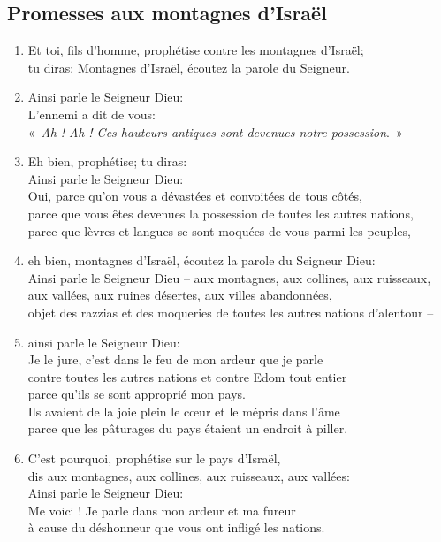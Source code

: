 \subsection*{Promesses aux montagnes d'Israël}
\begin{enumerate}[leftmargin=\psleftmargin, labelsep = \pslabelsep, label={\arabic*}, font=\color{\pscolor}\small\textsuperscript, parsep=0em, itemsep=0em, topsep=0em ]
    \item Et toi, fils d’homme, prophétise contre les montagnes d’Israël; \\ tu diras: Montagnes d’Israël, écoutez la parole du Seigneur.
    \item Ainsi parle le Seigneur Dieu: \\ L’ennemi a dit de vous: \\
          \decalage «~\textit{Ah ! Ah ! Ces hauteurs antiques sont devenues notre possession}.~»
    \item Eh bien, prophétise; tu diras: \\ Ainsi parle le Seigneur Dieu: \\ Oui, parce qu’on vous a dévastées et convoitées de tous côtés, \\ parce que vous êtes devenues la possession de toutes les autres nations, \\ parce que lèvres et langues se sont moquées de vous parmi les peuples,
    \item eh bien, montagnes d’Israël, écoutez la parole du Seigneur Dieu: \\ 
    Ainsi parle le Seigneur Dieu – aux montagnes, aux collines, aux ruisseaux, \\ aux vallées, aux ruines désertes, aux villes abandonnées, \\ objet des razzias et des moqueries de toutes les autres nations d’alentour –
    \item  ainsi parle le Seigneur Dieu: \\ Je le jure, c’est dans le feu de mon ardeur que je parle \\ contre toutes les autres nations et contre Edom tout entier \\
          parce qu’ils se sont approprié mon pays. \\ Ils avaient de la joie plein le cœur et le mépris dans l’âme \\ parce que les pâturages du pays étaient un endroit à piller. \verseSpace
    \item  C’est pourquoi, prophétise sur le pays d’Israël, \\ dis aux montagnes, aux collines, aux ruisseaux, aux vallées: \\ Ainsi parle le Seigneur Dieu: \\ Me voici ! Je parle dans mon ardeur et ma fureur \\ à cause du déshonneur que vous ont infligé les nations.

\end{enumerate}
